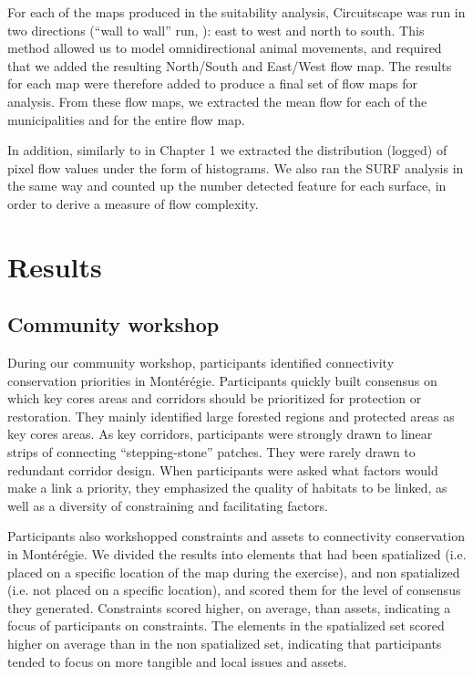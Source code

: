 For each of the maps produced in the suitability analysis, Circuitscape was run in two directions (“wall to wall” run, \cite{mcrae_conserving_2016}): east to west and north to south. This method allowed us to model omnidirectional animal movements, and required that we added the resulting North/South and East/West flow map. The results for each map were therefore added to produce a final set of flow maps for analysis. From these flow maps, we extracted the mean flow for each of the municipalities and for the entire flow map. 

In addition, similarly to in Chapter 1 we extracted the distribution (logged) of pixel flow values under the form of histograms. We also ran the SURF analysis in the same way and counted up the number detected feature for each surface, in order to derive a measure of flow complexity.\\

\section{Results}

\subsection{Community workshop}

During our community workshop, participants identified connectivity conservation priorities in Montérégie. Participants quickly built consensus on which key cores areas and corridors should be prioritized for protection or restoration. They mainly identified large forested regions and protected areas as key cores areas. As key corridors, participants were strongly drawn to linear strips of connecting “stepping-stone” patches. They were rarely drawn to redundant corridor design. When participants were asked what factors would make a link a priority, they emphasized the quality of habitats to be linked, as well as a diversity of constraining and facilitating factors.

Participants also workshopped constraints and assets to connectivity conservation in Montérégie. We divided the results into elements that had been spatialized (i.e. placed on a specific location of the map during the exercise), and non spatialized (i.e. not placed on a specific location), and scored them for the level of consensus they generated. Constraints scored higher, on average, than assets, indicating a focus of participants on constraints. The elements in the spatialized set scored higher on average than in the non spatialized set, indicating that participants tended to focus on more tangible and local issues and assets.

